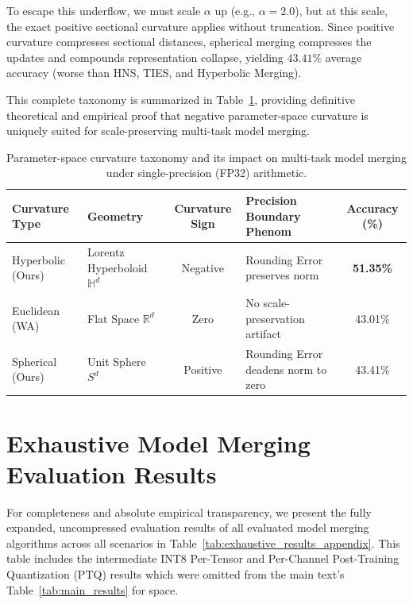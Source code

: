 \documentclass{article}
\theoremstyle{plain}
\theoremstyle{definition}
\theoremstyle{remark}
\begin{document}
To escape this underflow, we must scale $\alpha$ up (e.g., $\alpha = 2.0$), but at this scale, the exact positive sectional curvature applies without truncation. Since positive curvature compresses sectional distances, spherical merging compresses the updates and compounds representation collapse, yielding $43.41\%$ average accuracy (worse than HNS, TIES, and Hyperbolic Merging).

This complete taxonomy is summarized in Table~\ref{tab:taxonomy_summary}, providing definitive theoretical and empirical proof that negative parameter-space curvature is uniquely suited for scale-preserving multi-task model merging.

\begin{table}[H]
\caption{Parameter-space curvature taxonomy and its impact on multi-task model merging under single-precision (FP32) arithmetic.}
\label{tab:taxonomy_summary}
\vskip 0.15in
\begin{center}
\begin{small}
\setlength{\tabcolsep}{3.5pt}
\begin{tabular}{llclc}
\toprule
Curvature Type & Geometry & Curvature Sign & Precision Boundary Phenom & Accuracy (\%) \\
\midrule
Hyperbolic (Ours) & Lorentz Hyperboloid $\mathbb{H}^d$ & Negative & Rounding Error preserves norm & \textbf{51.35\%} \\
Euclidean (WA) & Flat Space $\mathbb{R}^d$ & Zero & No scale-preservation artifact & 43.01\% \\
Spherical (Ours) & Unit Sphere $S^d$ & Positive & Rounding Error deadens norm to zero & 43.41\% \\
\bottomrule
\end{tabular}
\end{small}
\end{center}
\vskip -0.1in
\end{table}

\section{Exhaustive Model Merging Evaluation Results}
\label{sec:exhaustive_results_appendix}
For completeness and absolute empirical transparency, we present the fully expanded, uncompressed evaluation results of all evaluated model merging algorithms across all scenarios in Table~\ref{tab:exhaustive_results_appendix}. This table includes the intermediate INT8 Per-Tensor and Per-Channel Post-Training Quantization (PTQ) results which were omitted from the main text's Table~\ref{tab:main_results} for space.
\end{document}
